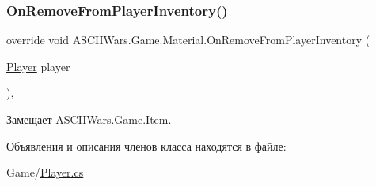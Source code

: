 \subsubsection{\texorpdfstring{On\+Remove\+From\+Player\+Inventory()}{OnRemoveFromPlayerInventory()}}
{\footnotesize\ttfamily override void A\+S\+C\+I\+I\+Wars.\+Game.\+Material.\+On\+Remove\+From\+Player\+Inventory (\begin{DoxyParamCaption}\item[{\hyperlink{class_a_s_c_i_i_wars_1_1_game_1_1_player}{Player}}]{player }\end{DoxyParamCaption})\hspace{0.3cm}{\ttfamily [inline]}, {\ttfamily [virtual]}}



Замещает \hyperlink{class_a_s_c_i_i_wars_1_1_game_1_1_item_a52412546f837bfc65a3aa9d728fa142f}{A\+S\+C\+I\+I\+Wars.\+Game.\+Item}.



Объявления и описания членов класса находятся в файле\+:\begin{DoxyCompactItemize}
\item 
Game/\hyperlink{_player_8cs}{Player.\+cs}\end{DoxyCompactItemize}
